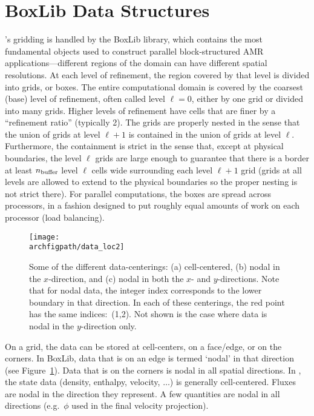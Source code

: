 \section{BoxLib Data Structures}

\maestro's gridding is handled by the BoxLib library, which
contains the most fundamental objects used to construct parallel
block-structured AMR applications---different
regions of the domain can have different spatial resolutions.
At each level of refinement, the region covered by that level is divided
into grids, or boxes.  The entire computational domain is covered by
the coarsest (base) level of refinement, often called level $\ell=0$, either by one
grid or divided into many grids.
Higher levels of refinement have cells that are finer by a ``refinement ratio''
(typically 2).  The grids are properly nested in the sense that the union 
of grids at level $\ell+1$ is contained in the union of grids at level $\ell$.
Furthermore, the containment is strict in the sense that, except at physical 
boundaries, the level $\ell$ grids are large enough to guarantee that there is
a border at least $n_{\rm buffer}$ level $\ell$ cells wide surrounding each level
$\ell +1$ grid (grids at all levels are allowed to extend to the physical
boundaries so the proper nesting is not strict there).  
For parallel computations, the boxes are spread across processors, in
a fashion designed to put roughly equal amounts of work on each
processor (load balancing).

\begin{figure}[t]
\centering
\texttt{[image: \\archfigpath/data\_loc2]}
\caption[Data-centerings on the grid]
  {\label{fig:dataloc} Some of the different data-centerings:
  (a) cell-centered, (b) nodal in the $x$-direction, and (c) nodal in
  both the $x$- and $y$-directions.  Note that for nodal data, the
  integer index corresponds to the lower boundary in that direction.
  In each of these centerings, the red point has the same indices:\ (1,2).
  Not shown is the case where data is nodal in the $y$-direction only.}
\end{figure}
On a grid, the data can be stored at cell-centers, on a face/edge, or
on the corners.  In BoxLib, data that is on an edge is termed `nodal'
in that direction (see Figure~\ref{fig:dataloc}).  Data that is on the
corners is nodal in all spatial directions.  In \maestro, the state
data (density, enthalpy, velocity, $\ldots$) is generally
cell-centered.  Fluxes are nodal in the direction they represent.
A few quantities are nodal in all directions (e.g.\ $\phi$ used in
the final velocity projection).

